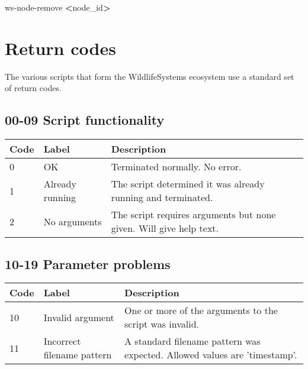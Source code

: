 \documentclass[
]{book}
\newenvironment{Shaded}{\begin{snugshade}}{\end{snugshade}}
\newcommand{\ExtensionTok}[1]{#1}
\newcommand{\NormalTok}[1]{#1}
\newcommand{\OperatorTok}[1]{\textcolor[rgb]{0.81,0.36,0.00}{\textbf{#1}}}
\begin{document}
\begin{Shaded}
\begin{Highlighting}[]
\ExtensionTok{ws{-}node{-}remove} \OperatorTok{\textless{}}\NormalTok{node\_id}\OperatorTok{\textgreater{}}
\end{Highlighting}
\end{Shaded}

\hypertarget{appendix-appendix}{%
\appendix}


\hypertarget{return-codes}{%
\chapter{Return codes}\label{return-codes}}

The various scripts that form the WildlifeSystems ecosystem use a standard set of return codes.

\hypertarget{script-functionality}{%
\section{00-09 Script functionality}\label{script-functionality}}

\begin{tabular}{l|l|l}
\hline
Code & Label & Description\\
\hline
0 & OK & Terminated normally. No error.\\
\hline
1 & Already running & The script determined it was already running and terminated.\\
\hline
2 & No arguments & The script requires arguments but none given. Will give help text.\\
\hline
\end{tabular}

\hypertarget{parameter-problems}{%
\section{10-19 Parameter problems}\label{parameter-problems}}

\begin{tabular}{l|l|l}
\hline
Code & Label & Description\\
\hline
10 & Invalid argument & One or more of the arguments to the script was invalid.\\
\hline
11 & Incorrect filename pattern & A standard filename pattern was expected. Allowed values are 'timestamp'.\\
\hline
\end{tabular}
\end{document}
